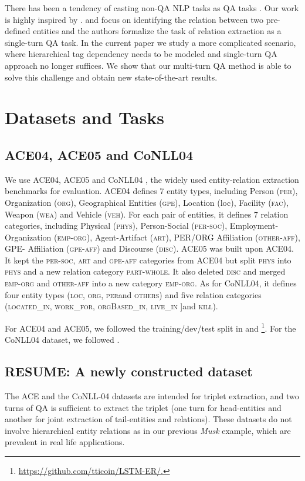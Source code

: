 \documentclass[11pt,a4paper]{article}
\newcommand{\loc}{\textsc{loc}}
\newcommand{\per}{\textsc{per}}
\newcommand{\org}{\textsc{org}}
\begin{document}
There has been a tendency of casting 
non-QA NLP tasks as QA tasks \cite{mccann2018natural}. 
Our work is highly inspired by . \citet{levy2017zero} and \citet{mccann2018natural} focus on identifying the relation between two pre-defined entities and the authors formalize the task of relation extraction as a single-turn QA task. 
 In the current paper we study a more complicated scenario, where hierarchical tag dependency needs to be modeled and single-turn QA approach no longer suffices. 
  We show that our multi-turn QA method is able to solve this challenge and obtain new state-of-the-art results. 

\section{Datasets and Tasks}
\subsection{ACE04, ACE05 and CoNLL04}
We use ACE04, ACE05
and CoNLL04 \cite{roth2004linear},
the widely used entity-relation extraction benchmarks for evaluation. 
ACE04 defines 7  entity types, including  Person (\textsc{per}), Organization (\textsc{org}), Geographical Entities (\textsc{gpe}), Location (loc),
Facility (\textsc{fac}), Weapon (\textsc{wea}) and Vehicle (\textsc{veh}). 
For each pair of entities, it defines 7 relation categories, including 
Physical (\textsc{phys}), Person-Social (\textsc{per-soc}), Employment-Organization (\textsc{emp-org}), Agent-Artifact (\textsc{art}), PER/ORG Affiliation (\textsc{other-aff}), GPE-
Affiliation (\textsc{gpe-aff}) and Discourse (\textsc{disc}). 
ACE05 
 was built upon ACE04. It kept the  \textsc{per-soc}, \textsc{art} and \textsc{gpe-aff} categories from ACE04 but split \textsc{phys} into \textsc{phys}  and a new relation category 
\textsc{part-whole}. It also deleted \textsc{disc} and merged \textsc{emp-org} and \textsc{other-aff} into a new category \textsc{emp-org}. 
As for CoNLL04, it defines four entity
types (\loc, \org, \per and \textsc{others})  and five relation categories (\textsc{located\_in}, \textsc{work\_for}, \textsc{orgBased\_in}, \textsc{live\_in} ]and \textsc{kill}).


For ACE04 and ACE05, we followed the training/dev/test split in  and \footnote{\url{https://github.com/tticoin/LSTM-ER/.}}. For the CoNLL04 dataset, we followed  .

\subsection{RESUME: A newly constructed dataset}
The ACE and the CoNLL-04 datasets are intended for triplet extraction, and two turns of QA is sufficient to extract the triplet (one turn for head-entities and another for joint extraction of tail-entities and relations).
These datasets do not involve hierarchical entity relations as in our previous {\it Musk} example, which are prevalent in real life applications.
\end{document}
